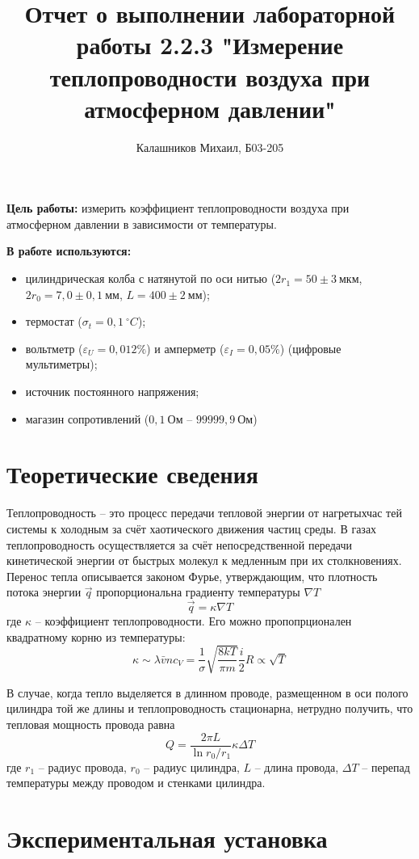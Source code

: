 \documentclass[14pt, a4paper]{report}
\title{\textbf{Отчет о выполнении лабораторной работы 2.2.3 "Измерение теплопроводности воздуха при атмосферном давлении"}}
\author{Калашников Михаил, Б03-205}
\date{}
\begin{document}
\maketitle

\textbf{Цель работы:}
измерить коэффициент теплопроводности воздуха при атмосферном давлении в зависимости от температуры.
\newline

\textbf{В работе используются:}
\begin{itemize}
\item цилиндрическая колба с натянутой по оси нитью ($2r_1=50\pm3\ мкм$, $2r_0=7,0\pm0,1\ мм$, $L=400\pm2\ мм$);
\item термостат ($\sigma_{t}=0,1\ ^\circ C$);
\item вольтметр ($\varepsilon_{U}=0,012\%$) и амперметр ($\varepsilon_{I}=0,05\%$) (цифровые мультиметры);
\item источник постоянного напряжения;
\item магазин сопротивлений ($0,1\ Ом$ -- $99999,9\ Ом$)
\end{itemize}

\section{Теоретические сведения}

Теплопроводность -- это процесс передачи тепловой энергии от нагретыхчас тей системы к холодным за счёт хаотического движения частиц среды. В газах теплопроводность осуществляется за счёт непосредственной передачи кинетической энергии от быстрых молекул к медленным при их столкновениях.
Перенос тепла описывается законом Фурье, утверждающим, что плотность потока энергии $\vec{q}$ пропорциональна градиенту температуры $\nabla T$
\[\vec{q}=\kappa\nabla T\]
где $\kappa$ -- коэффициент теплопроводности. Его можно пропопрционален квадратному корню из температуры:
\[\kappa\sim\lambda\bar{v}nc_V=\frac{1}{\sigma}\sqrt{\frac{8kT}{\pi m}}\frac{i}{2}R\propto\sqrt{T}\]

В случае, когда тепло выделяется в длинном проводе, размещенном в оси полого цилиндра той же длины и теплопроводность стационарна, нетрудно получить, что тепловая мощность провода равна
\[Q=\frac{2\pi L}{\ln r_0/r_1}\kappa\Delta T\]
где $r_1$ -- радиус провода, $r_0$ -- радиус цилиндра, $L$ -- длина провода, $\Delta T$ -- перепад температуры между проводом и стенками цилиндра.

\section{Экспериментальная установка}
\end{document}

